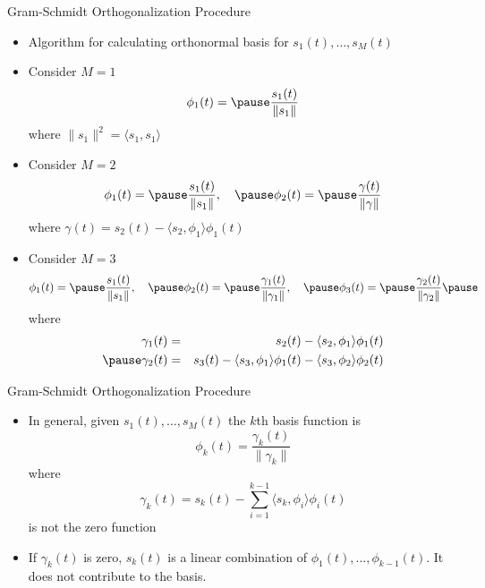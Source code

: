 \documentclass[t]{beamer}
\begin{document}
\begin{frame}{Gram-Schmidt Orthogonalization Procedure}
  \footnotesize
  \begin{itemize}
    \item \pause Algorithm for calculating orthonormal basis for $s_1(t),\ldots,s_M(t)$
    \item \pause Consider $M = 1$
      \begin{equation*}
        \phi_1(t) = \pause \frac{s_1(t)}{\lVert s_1 \rVert}
      \end{equation*}
      where $\lVert s_1 \rVert^2 = \langle s_1, s_1 \rangle$
    \item \pause Consider $M = 2$
      \begin{eqnarray*}
        \phi_1(t) = \pause \frac{s_1(t)}{\lVert s_1 \rVert}, \ \ \  \pause \phi_2(t) = \pause \frac{\gamma(t)}{\lVert \gamma \rVert}
      \end{eqnarray*}
      \pause where $\gamma(t) = s_2(t) - \langle s_2, \phi_1 \rangle \phi_1(t)$
    \item \pause Consider $M = 3$
      \begin{eqnarray*}
        \phi_1(t) = \pause \frac{s_1(t)}{\lVert s_1 \rVert}, \ \ \ \pause
        \phi_2(t) = \pause \frac{\gamma_1(t)}{\lVert \gamma_1 \rVert}, \ \ \ \pause
        \phi_3(t) = \pause \frac{\gamma_2(t)}{\lVert \gamma_2 \rVert} \pause
      \end{eqnarray*}
      where
      \begin{eqnarray*}
        \gamma_1(t) & = & s_2(t) - \langle s_2, \phi_1 \rangle \phi_1(t) \\ \pause 
        \gamma_2(t) & = & s_3(t) - \langle s_3, \phi_1 \rangle \phi_1(t) - \langle s_3, \phi_2 \rangle \phi_2(t)
      \end{eqnarray*}
  \end{itemize}
  \normalsize
\end{frame}

\begin{frame}{Gram-Schmidt Orthogonalization Procedure}
  \footnotesize
  \begin{itemize}
    \item \pause In general, given $s_1(t),\ldots,s_M(t)$ the $k$th basis function is
      \begin{equation*}
        \phi_k(t) = \frac{\gamma_k(t)}{\lVert \gamma_k \rVert}
      \end{equation*}
    \pause where 
    \begin{equation*}
      \gamma_k(t) = s_k(t) - \sum_{i=1}^{k-1} \langle s_k, \phi_i \rangle \phi_i(t)
    \end{equation*}
    is not the zero function
    \item \pause If $\gamma_k(t)$ is zero, $s_k(t)$ is a linear combination of $\phi_1(t),\ldots,\phi_{k-1}(t)$. \pause It does not contribute to the basis.
  \end{itemize}
  \normalsize
\end{frame}
\end{document}
